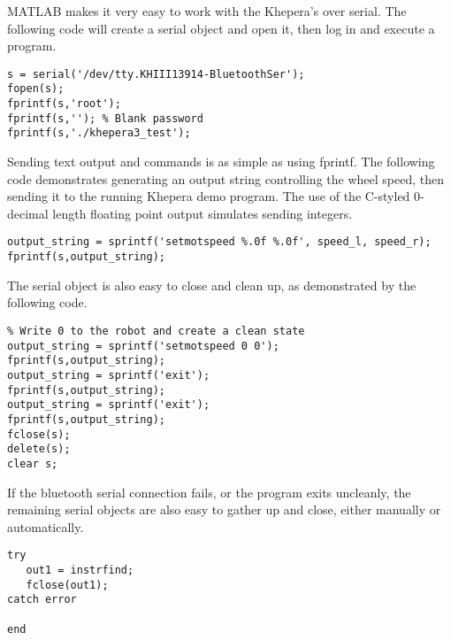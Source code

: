 MATLAB makes it very easy to work with the Khepera's over serial. The following code will create a serial object and open it, then log in and execute a program.
\begin{verbatim}
s = serial('/dev/tty.KHIII13914-BluetoothSer');
fopen(s);
fprintf(s,'root');
fprintf(s,''); % Blank password
fprintf(s,'./khepera3_test');
\end{verbatim}

Sending text output and commands is as simple as using fprintf. The following code demonstrates generating an output string controlling the wheel speed, then sending it to the running Khepera demo program. The use of the C-styled 0-decimal length floating point output simulates sending integers.
\begin{verbatim}
output_string = sprintf('setmotspeed %.0f %.0f', speed_l, speed_r);
fprintf(s,output_string);
\end{verbatim}

The serial object is also easy to close and clean up, as demonstrated by the following code.
\begin{verbatim}
% Write 0 to the robot and create a clean state
output_string = sprintf('setmotspeed 0 0');
fprintf(s,output_string);
output_string = sprintf('exit');
fprintf(s,output_string);
output_string = sprintf('exit');
fprintf(s,output_string);
fclose(s);
delete(s);
clear s;
\end{verbatim}

If the bluetooth serial connection fails, or the program exits uncleanly, the remaining serial objects are also easy to gather up and close, either manually or automatically.
\begin{verbatim}
try
   out1 = instrfind;
   fclose(out1);
catch error

end
\end{verbatim}

